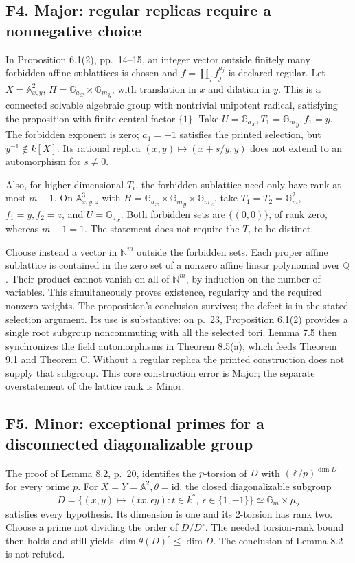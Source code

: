 \documentclass[10pt]{article}
\begin{document}
\subsection*{F4. Major: regular replicas require a nonnegative choice}
In Proposition 6.1(2), pp. 14–15, an integer vector outside finitely many forbidden affine sublattices is chosen and \(f=\prod_j f_j^{a_j}\) is declared regular. Let \(X=\mathbb A^2_{x,y}\), \(H={\mathbb G_a}_x\times{\mathbb G_m}_y\), with translation in \(x\) and dilation in \(y\). This is a connected solvable algebraic group with nontrivial unipotent radical, satisfying the proposition with finite central factor \(\{1\}\). Take \(U={\mathbb G_a}_x,T_1={\mathbb G_m}_y,f_1=y\). The forbidden exponent is zero; \(a_1=-1\) satisfies the printed selection, but \(y^{-1}\notin k[X]\). Its rational replica \((x,y)\mapsto(x+s/y,y)\) does not extend to an automorphism for \(s\ne0\).\par
Also, for higher-dimensional \(T_i\), the forbidden sublattice need only have rank at most \(m-1\). On \(\mathbb A^3_{x,y,z}\) with \(H={\mathbb G_a}_x\times{\mathbb G_m}_y^{}\times{\mathbb G_m}_z^{}\), take \(T_1=T_2=\mathbb G_m^2\), \(f_1=y,f_2=z\), and \(U={\mathbb G_a}_x\). Both forbidden sets are \(\{(0,0)\}\), of rank zero, whereas \(m-1=1\). The statement does not require the \(T_i\) to be distinct.\par
Choose instead a vector in \(\mathbb N^m\) outside the forbidden sets. Each proper affine sublattice is contained in the zero set of a nonzero affine linear polynomial over \(\mathbb Q\). Their product cannot vanish on all of \(\mathbb N^m\), by induction on the number of variables. This simultaneously proves existence, regularity and the required nonzero weights. The proposition’s conclusion survives; the defect is in the stated selection argument. Its use is substantive: on p. 23, Proposition 6.1(2) provides a single root subgroup noncommuting with all the selected tori. Lemma 7.5 then synchronizes the field automorphisms in Theorem 8.5(a), which feeds Theorem 9.1 and Theorem C. Without a regular replica the printed construction does not supply that subgroup. This core construction error is Major; the separate overstatement of the lattice rank is Minor.\par
\subsection*{F5. Minor: exceptional primes for a disconnected diagonalizable group}
The proof of Lemma 8.2, p. 20, identifies the \(p\)-torsion of \(D\) with \((\mathbb Z/p)^{\dim D}\) for every prime \(p\). For \(X=Y=\mathbb A^2,\theta=\mathrm{id}\), the closed diagonalizable subgroup \[D=\{(x,y)\mapsto(t x,\epsilon y):t\in k^*,\ \epsilon\in\{1,-1\}\}
       \simeq\mathbb G_m\times\mu_2\] satisfies every hypothesis. Its dimension is one and its 2-torsion has rank two. Choose a prime not dividing the order of \(D/D^\circ\). The needed torsion-rank bound then holds and still yields \(\dim\theta(D)^\circ\le\dim D\). The conclusion of Lemma 8.2 is not refuted.\par
\end{document}
